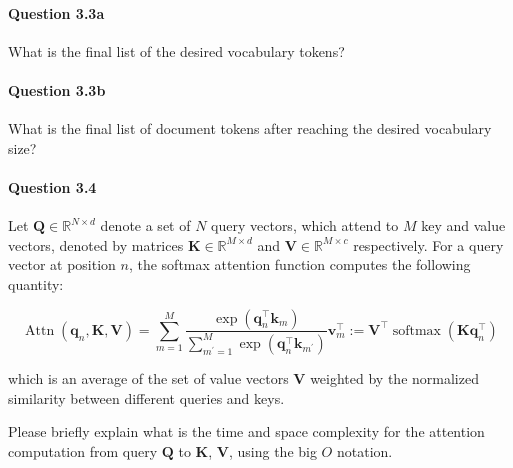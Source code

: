 \documentclass[10pt]{article}
\begin{document}
\paragraph{Question 3.3a} What is the final list of the desired vocabulary tokens?
\paragraph{Question 3.3b} What is the final list of document tokens after reaching the desired vocabulary size?

\newpage
\paragraph{Question 3.4} Let $\mathbf{Q} \in \mathbb{R}^{N \times d}$ denote a set of $N$ query vectors, which attend to $M$ key and value vectors, denoted by matrices $\mathbf{K} \in \mathbb{R}^{M \times d}$ and $\mathbf{V} \in \mathbb{R}^{M \times c}$ respectively. For a query vector at position $n$, the softmax attention function computes the following quantity:

$$
  \operatorname{Attn}\left(\mathbf{q}_{n}, \mathbf{K}, \mathbf{V}\right)=\sum_{m=1}^{M} \frac{\exp \left(\mathbf{q}_{n}^{\top} \mathbf{k}_{m}\right)}{\sum_{m^{\prime}=1}^{M} \exp \left(\mathbf{q}_{n}^{\top} \mathbf{k}_{m^{\prime}}\right)} \mathbf{v}_{m}^{\top}:=\mathbf{V}^{\top} \operatorname{softmax}\left(\mathbf{K} \mathbf{q}_{n}^{\top}\right)
$$

which is an average of the set of value vectors $\mathbf{V}$ weighted by the normalized similarity between different queries and keys.

Please briefly explain what is the time and space complexity for the attention computation from query $\mathbf{Q}$ to $\mathbf{K}$, $\mathbf{V}$, using the big $O$ notation.
\end{document}
